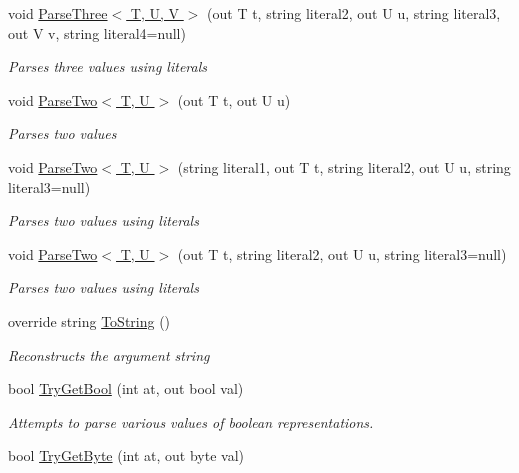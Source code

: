\begin{DoxyCompactItemize}
void \hyperlink{classOTA_1_1Command_1_1ArgumentList_a6155ee5ada5b77594469013e00749d6a}{Parse\+Three$<$ T, U, V $>$} (out T t, string literal2, out U u, string literal3, out V v, string literal4=null)
\begin{DoxyCompactList}\small\item\em Parses three values using literals \end{DoxyCompactList}\item 
void \hyperlink{classOTA_1_1Command_1_1ArgumentList_a99b1b6ad5e24854820739767af9e22b1}{Parse\+Two$<$ T, U $>$} (out T t, out U u)
\begin{DoxyCompactList}\small\item\em Parses two values \end{DoxyCompactList}\item 
void \hyperlink{classOTA_1_1Command_1_1ArgumentList_a6e1ece5e45c1f199565e609ae4901318}{Parse\+Two$<$ T, U $>$} (string literal1, out T t, string literal2, out U u, string literal3=null)
\begin{DoxyCompactList}\small\item\em Parses two values using literals \end{DoxyCompactList}\item 
void \hyperlink{classOTA_1_1Command_1_1ArgumentList_ab0f677e178b1dba8b3406e0cc380acd5}{Parse\+Two$<$ T, U $>$} (out T t, string literal2, out U u, string literal3=null)
\begin{DoxyCompactList}\small\item\em Parses two values using literals \end{DoxyCompactList}\item 
override string \hyperlink{classOTA_1_1Command_1_1ArgumentList_aa73e7c4dd1df5fd5fbf81c7764ee1533}{To\+String} ()
\begin{DoxyCompactList}\small\item\em Reconstructs the argument string \end{DoxyCompactList}\item 
bool \hyperlink{classOTA_1_1Command_1_1ArgumentList_ae016a77e02d2ba7793dc6ceeefebf681}{Try\+Get\+Bool} (int at, out bool val)
\begin{DoxyCompactList}\small\item\em Attempts to parse various values of boolean representations. \end{DoxyCompactList}\item 
bool \hyperlink{classOTA_1_1Command_1_1ArgumentList_a750303160a7c9d3e107d155013930944}{Try\+Get\+Byte} (int at, out byte val)

\end{DoxyCompactItemize}
